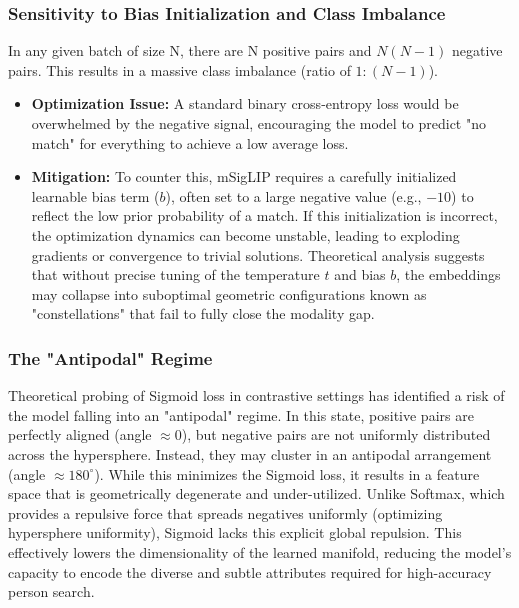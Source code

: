 \documentclass[../main.tex]{subfiles}
\begin{document}
\subsubsection{Sensitivity to Bias Initialization and Class Imbalance}

\noindent In any given batch of size N, there are N positive pairs and $N(N - 1)$ negative pairs. This results in a massive class imbalance (ratio of $1:(N - 1)$).

\begin{itemize}
    \item \textbf{Optimization Issue:} A standard binary cross-entropy loss would be overwhelmed by the negative signal, encouraging the model to predict "no match" for everything to achieve a low average loss.
    \item \textbf{Mitigation:} To counter this, mSigLIP requires a carefully initialized learnable bias term ($b$), often set to a large negative value (e.g., $-10$) to reflect the low prior probability of a match. If this initialization is incorrect, the optimization dynamics can become unstable, leading to exploding gradients or convergence to trivial solutions. Theoretical analysis suggests that without precise tuning of the temperature $t$ and bias $b$, the embeddings may collapse into suboptimal geometric configurations known as "constellations" that fail to fully close the modality gap.
\end{itemize}

\subsubsection{The "Antipodal" Regime}

\noindent Theoretical probing of Sigmoid loss in contrastive settings has identified a risk of the model falling into an "antipodal" regime. In this state, positive pairs are perfectly aligned (angle $\approx 0$), but negative pairs are not uniformly distributed across the hypersphere. Instead, they may cluster in an antipodal arrangement (angle $\approx 180^\circ$). While this minimizes the Sigmoid loss, it results in a feature space that is geometrically degenerate and under-utilized. Unlike Softmax, which provides a repulsive force that spreads negatives uniformly (optimizing hypersphere uniformity), Sigmoid lacks this explicit global repulsion. This effectively lowers the dimensionality of the learned manifold, reducing the model's capacity to encode the diverse and subtle attributes required for high-accuracy person search.
\end{document}
